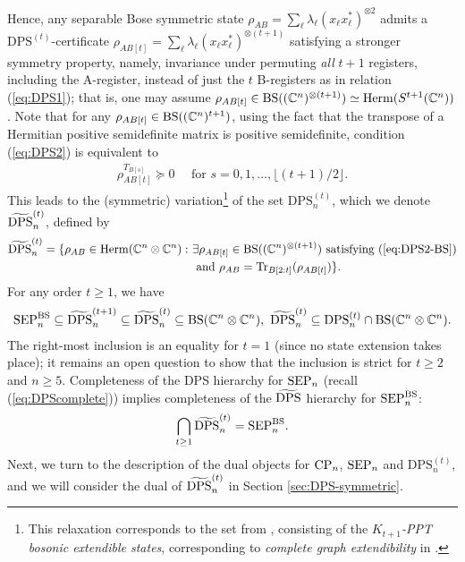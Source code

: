 \documentclass[11pt]{article}
\newcommand{\C}{\ensuremath{\mathbb{C}}} %
\newcommand{\Herm}{\mathrm{Herm}}
\newcommand{\Cnn}{\C^n\ot \C^n}
\newcommand{\Cnnt}{\C^n\ot (\C^n)^{\ot t}}
\newcommand{\SEP}{\text{\rm SEP}}
\newcommand{\CP}{\text{\rm CP}}
\newcommand{\DPS}{\text{\rm DPS}}
\newcommand{\DPSt}{\mathrm{DPS}^{(t)}}
\newcommand{\SEPBS}{\SEP^{\BS}}
\newcommand{\tilDPS}{\widetilde {\DPS}}
\newcommand{\tilDPSt}{\widetilde{\DPS}^{(t)}}
\newcommand{\Tr}{\text{\rm Tr}}
\newcommand{\ot}{\otimes}
\newcommand{\BS}{\text{\rm BS}}
\theoremstyle{plain}
\newcommand{\ML}{\textcolor{blue}}
\begin{document}
\noindent
Hence,   any separable Bose symmetric state $\rho_{AB}=\sum_\ell \lambda_\ell (x_\ell x_\ell^*)^{\ot 2}
$ admits a $\DPSt$-certificate 
$\rho_{AB[t]}= \sum_\ell \lambda_\ell (x_\ell x_\ell^*  )^{\ot (t+1)} $ satisfying a stronger symmetry property, namely, invariance under permuting {\em all} $t+1$ registers, including the A-register, instead of just the $t$ B-registers as  in relation (\ref{eq:DPS1}); that is, one may assume  
$\rho_{AB[t]}\in  \BS((\C^n)^{\ot (t+1)})\simeq \Herm(S^{t+1}(\C^n))$. 
 Note that for any $\rho_{AB[t]}\in \BS((\C^n)^{t+1})$, using the fact that the transpose of a Hermitian positive semidefinite matrix is positive semidefinite,
 condition  (\ref{eq:DPS2}) is equivalent to
 \begin{align}\label{eq:DPS2-BS}
 \rho_{AB[t]}^{T_{B[s]}}\succeq 0 \quad \text{ for } s=0, 1,\ldots,  \lfloor (t+1)/2\rfloor.
 \end{align}
This leads to the (symmetric)  variation\footnote{This relaxation corresponds to the set 
 from \cite[Section 8.2]{GNP_2025}, consisting of  the
{\em $K_{t+1}$-PPT bosonic extendible states}, corresponding to {\em complete graph extendibility} in \cite{ACGNO_2023}.}
 of the set $\DPSt_n$, which we denote $\tilDPSt_n$, defined by
\begin{align}\label{eq:DPSt-BS}
\begin{split}
\tilDPSt_n=\{\rho_{AB}\in\Herm(\Cnn):\ & \exists \rho_{AB[t]}\in \BS((\C^n)^{\ot (t+1)}) \text{ satisfying } (\ref{eq:DPS2-BS})   \\
& \text{ and }   \rho_{AB}=\Tr_{B[2:t]}(\rho_{AB[t]})\}.
\end{split}
\end{align}
For any order  $t\ge 1$, we have
\begin{align}\label{eq:DPS-BS-inclusion}
\SEPBS_n\subseteq \tilDPS^{(t+1)}_n\subseteq \tilDPSt_n\subseteq \BS(\Cnn),\
\tilDPSt_n\subseteq \DPSt_n\cap \BS(\Cnn).
\end{align}
 The right-most  inclusion is an equality for $t=1$  (since no state extension takes place); it remains an open question to show that the inclusion is strict for $t\ge 2$ and $ n\ge 5$. 
Completeness of the DPS hierarchy for $\SEP_n$ (recall (\ref{eq:DPScomplete})) implies completeness of the $\tilDPS$ hierarchy for $\SEPBS_n$:
$$\bigcap_{t\ge 1}\tilDPSt_n =\SEPBS_n.$$  
 Next, we turn to the description of the dual objects for $\CP_n$, $\SEP_n$ and $\DPSt_n$, and we will consider the dual of $\tilDPSt_n$ in Section \ref{sec:DPS-symmetric}.
 
\end{document}
